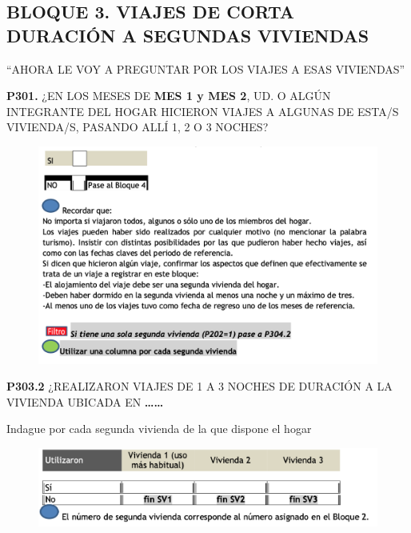 \documentclass[
  openany]{book}
\begin{document}
\hypertarget{bloque-3.-viajes-de-corta-duraciuxf3n-a-segundas-viviendas}{%
\subsection{\texorpdfstring{\textbf{BLOQUE 3. VIAJES DE CORTA DURACIÓN A SEGUNDAS VIVIENDAS}}{BLOQUE 3. VIAJES DE CORTA DURACIÓN A SEGUNDAS VIVIENDAS}}\label{bloque-3.-viajes-de-corta-duraciuxf3n-a-segundas-viviendas}}

``AHORA LE VOY A PREGUNTAR POR LOS VIAJES A ESAS VIVIENDAS''

\textbf{P301.} ¿EN LOS MESES DE \textbf{MES 1 y MES 2}, UD. O ALGÚN INTEGRANTE DEL HOGAR HICIERON VIAJES A ALGUNAS DE ESTA/S VIVIENDA/S, PASANDO ALLÍ 1, 2 O 3 NOCHES?

\begin{figure}

{\centering \includegraphics[width=1\linewidth]{imagenes/figura6-158} 

}

\end{figure}

\textbf{P303.2} ¿REALIZARON VIAJES DE 1 A 3 NOCHES DE DURACIÓN A LA VIVIENDA UBICADA EN
\textbf{\ldots\ldots{}}

Indague por cada segunda vivienda de la que dispone el hogar

\begin{figure}

{\centering \includegraphics[width=1\linewidth]{imagenes/figura6-159} 

}

\end{figure}
\end{document}
